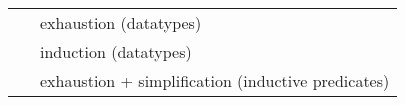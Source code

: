 \begin{isabellebody}
\begin{isamarkuptext}
\begin{tabular}{ll}
    \hyperlink{method.case-tac}{\mbox{\isa{case{\isaliteral{5F}{\isacharunderscore}}tac}}}~\isa{t} & exhaustion (datatypes) \\
    \hyperlink{method.induct-tac}{\mbox{\isa{induct{\isaliteral{5F}{\isacharunderscore}}tac}}}~\isa{x} & induction (datatypes) \\
    \hyperlink{method.ind-cases}{\mbox{\isa{ind{\isaliteral{5F}{\isacharunderscore}}cases}}}~\isa{t} & exhaustion + simplification (inductive predicates) \\
  \end{tabular}%
\end{isamarkuptext}%
\isamarkuptrue%
%
\isadelimtheory
%
\endisadelimtheory
%
\isatagtheory
{}\isamarkupfalse%
%
\endisatagtheory
{\isafoldtheory}%
%
\isadelimtheory
%
\endisadelimtheory
\isanewline
\end{isabellebody}%
